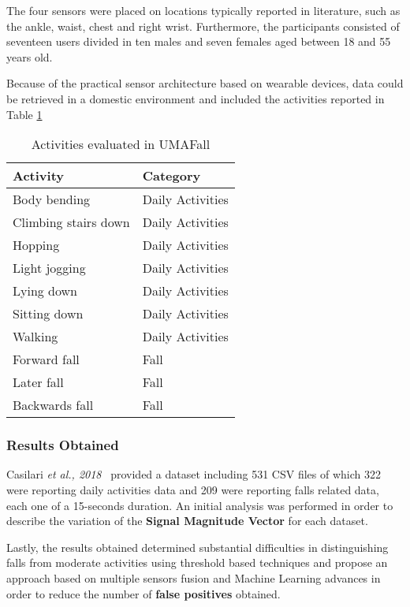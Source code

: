 The four sensors were placed on locations typically reported in literature, such as the ankle, waist, chest and right wrist. Furthermore, the participants consisted of seventeen users divided in ten males and seven females aged between 18 and 55 years old.

Because of the practical sensor architecture based on wearable devices, data could be retrieved in a domestic environment and included the activities reported in Table \ref{toc:umafall}

\begin{table}[H]
\centering
\begin{tabular}{ll}
    \hline
    Activity                & Category \\
    \hline
    Body bending            & Daily Activities \\
    Climbing stairs down    & Daily Activities \\
    Hopping                 & Daily Activities \\
    Light jogging           & Daily Activities \\
    Lying down              & Daily Activities \\
    Sitting down            & Daily Activities \\
    Walking                 & Daily Activities \\
    Forward fall            & Fall \\
    Later fall              & Fall \\
    Backwards fall          & Fall \\
    \hline
\end{tabular}
\caption{Activities evaluated in UMAFall}
\label{toc:umafall}
\end{table}

\subsubsection{Results Obtained}\label{subsubsec:umafall-results}

Casilari \textit{et al., 2018}~\cite{umafall} provided a dataset including 531 CSV files of which 322 were reporting daily activities data and 209 were reporting falls related data, each one of a 15-seconds duration. An initial analysis was performed in order to describe the variation of the \textbf{Signal Magnitude Vector} for each dataset.

Lastly, the results obtained determined substantial difficulties in distinguishing falls from moderate activities using threshold based techniques and propose an approach based on multiple sensors fusion and Machine Learning advances in order to reduce the number of \textbf{false positives} obtained. 

